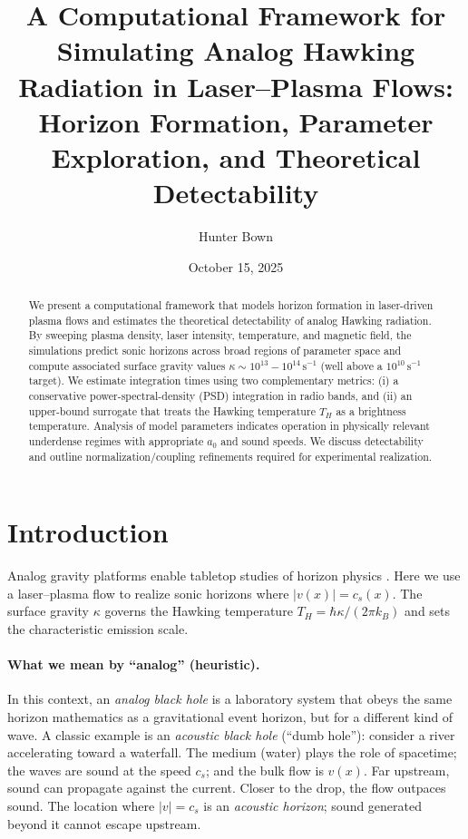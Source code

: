 \documentclass[11pt]{article}
\title{A Computational Framework for Simulating Analog Hawking Radiation in Laser--Plasma Flows: Horizon Formation, Parameter Exploration, and Theoretical Detectability}
\author{Hunter Bown}
\date{October 15, 2025}
\begin{document}
\maketitle

\begin{abstract}
We present a computational framework that models horizon formation in laser-driven plasma flows and estimates the theoretical detectability of analog Hawking radiation. By sweeping plasma density, laser intensity, temperature, and magnetic field, the simulations predict sonic horizons across broad regions of parameter space and compute associated surface gravity values $\kappa \sim 10^{13}{-}10^{14}\,\mathrm{s^{-1}}$ (well above a $10^{10}\,\mathrm{s^{-1}}$ target). We estimate integration times using two complementary metrics: (i) a conservative power-spectral-density (PSD) integration in radio bands, and (ii) an upper-bound surrogate that treats the Hawking temperature $T_H$ as a brightness temperature. Analysis of model parameters indicates operation in physically relevant underdense regimes with appropriate $a_0$ and sound speeds. We discuss detectability and outline normalization/coupling refinements required for experimental realization.
\end{abstract}

\section{Introduction}
Analog gravity platforms enable tabletop studies of horizon physics \cite{Hawking1974,Hawking1975,Unruh1981,Barcelo2011,Weinfurtner2011,Steinhauer2016,Drori2019}. Here we use a laser--plasma flow to realize sonic horizons where $|v(x)| = c_s(x)$. The surface gravity $\kappa$ governs the Hawking temperature $T_H = \hbar \kappa/(2\pi k_B)$ and sets the characteristic emission scale.

\paragraph{What we mean by ``analog'' (heuristic).}
In this context, an \emph{analog black hole} is a laboratory system that obeys the same horizon mathematics as a gravitational event horizon, but for a different kind of wave. A classic example is an \emph{acoustic black hole} (``dumb hole''): consider a river accelerating toward a waterfall. The medium (water) plays the role of spacetime; the waves are sound at the speed $c_s$; and the bulk flow is $v(x)$. Far upstream, sound can propagate against the current. Closer to the drop, the flow outpaces sound. The location where $|v| = c_s$ is an \emph{acoustic horizon}; sound generated beyond it cannot escape upstream.
\end{document}
